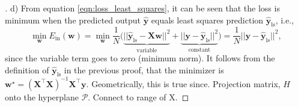 \documentclass{article}
\renewcommand{\vec}[1]{\mathbf{#1}}
\begin{document}
    \begin{proof}[\unskip\nopunct]
        d) From equation \eqref{eqn:loss_least_squares}, it can be seen that 
        the loss is minimum when the predicted output $\hat{\vec{y}}$ equals 
        least squares prediction 
        $\hat{\vec{y}}_{\text{ls}}$, i.e.,
        \[
            \min_{\vec{w}} E_{\text{in}}(\vec{w})=\min_{\vec{w}}\frac{1}{N}
            \big(\underbrace{||\hat{\vec{y}}_{\text{ls}}-\vec{X}\vec{w}||^2}_
            {\text{variable}} + \underbrace{||\vec{y}-\hat{\vec{y}}_
            {\text{ls}}||^2}_{\text{constant}}\big) = \frac{1}{N}||\vec{y}
            -\hat{\vec{y}}_{\text{ls}}||^2,
        \]
        since the variable term goes to zero (minimum norm). It follows from 
        the definition of $\hat{\vec{y}}_{\text{ls}}$ in the previous proof, 
        that the minimizer is $\vec{w}^\star = (\vec{X}^\top\vec{X})^{-1}
        \vec{X}^\top\vec{y}$. Geometrically, this is true since. Projection 
        matrix, $H$ onto the hyperplane $\mathcal{P}$. Connect to range of X.
    \end{proof}
\end{document}
